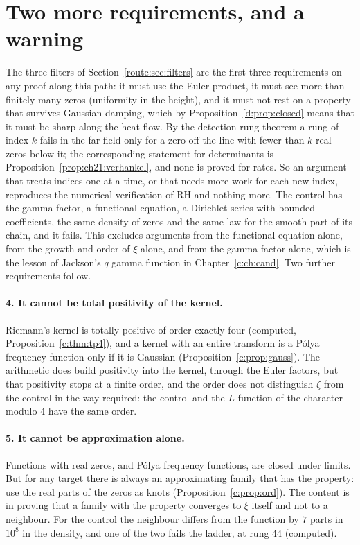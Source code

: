 \section{Two more requirements, and a warning}\label{d:sec:req}

The three filters of Section~\ref{route:sec:filters} are the first three requirements on any proof along this path: it must use the Euler product, it must see more than finitely many zeros (uniformity in the height), and it must not rest on a property that survives Gaussian damping, which by Proposition~\ref{d:prop:closed} means that it must be sharp along the heat flow. By the detection rung theorem a rung of index $k$ fails in the far field only for a zero off the line with fewer than $k$ real zeros below it; the corresponding statement for determinants is Proposition~\ref{prop:ch21:verhankel}, and none is proved for rates. So an argument that treats indices one at a time, or that needs more work for each new index, reproduces the numerical verification of RH and nothing more. The control has the gamma factor, a functional equation, a Dirichlet series with bounded coefficients, the same density of zeros and the same law for the smooth part of its chain, and it fails. This excludes arguments from the functional equation alone, from the growth and order of $\xi$ alone, and from the gamma factor alone, which is the lesson of Jackson's $q$ gamma function in Chapter~\ref{c:ch:cand}. Two further requirements follow.

\paragraph{4. It cannot be total positivity of the kernel.} Riemann's kernel is totally positive of order exactly four (computed, Proposition~\ref{c:thm:tp4}), and a kernel with an entire transform is a Pólya frequency function only if it is Gaussian (Proposition~\ref{c:prop:gauss}). The arithmetic does build positivity into the kernel, through the Euler factors, but that positivity stops at a finite order, and the order does not distinguish $\zeta$ from the control in the way required: the control and the $L$ function of the character modulo $4$ have the same order.

\paragraph{5. It cannot be approximation alone.} Functions with real zeros, and Pólya frequency functions, are closed under limits. But for any target there is always an approximating family that has the property: use the real parts of the zeros as knots (Proposition~\ref{c:prop:ord}). The content is in proving that a family with the property converges to $\xi$ itself and not to a neighbour. For the control the neighbour differs from the function by $7$ parts in $10^8$ in the density, and one of the two fails the ladder, at rung $44$ (computed).


